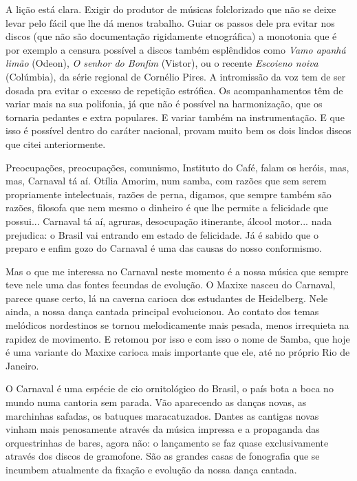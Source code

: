 A lição está clara. Exigir do produtor de músicas folclorizado que não
se deixe levar pelo fácil que lhe dá menos trabalho. Guiar os passos
dele pra evitar nos discos (que não são documentação rigidamente
etnográfica) a monotonia que é por exemplo a censura possível a discos
também esplêndidos como \emph{Vamo apanhá limão} (Odeon), \emph{O senhor
do Bonfim} (Vistor), ou o recente \emph{Escoieno noiva} (Colúmbia), da
série regional de Cornélio Pires. A intromissão da voz tem de ser dosada
pra evitar o excesso de repetição estrófica. Os acompanhamentos têm de
variar mais na sua polifonia, já que não é possível na harmonização, que
os tornaria pedantes e extra populares. E variar também na
instrumentação. E que isso é possível dentro do caráter nacional, provam
muito bem os dois lindos discos que citei anteriormente.




Preocupações, preocupações, comunismo, Instituto do Café, falam os
heróis, mas, mas, Carnaval tá aí. Otília Amorim, num samba, com razões
que sem serem propriamente intelectuais, razões de perna, digamos, que
sempre também são razões, filosofa que nem mesmo o dinheiro é que lhe
permite a felicidade que possui... Carnaval tá aí, agruras, desocupação
itinerante, álcool motor... nada prejudica: o Brasil vai entrando em
estado de felicidade. Já é sabido que o preparo e enfim gozo do Carnaval
é uma das causas do nosso conformismo.

Mas o que me interessa no Carnaval neste momento é a nossa música que
sempre teve nele uma das fontes fecundas de evolução. O Maxixe nasceu do
Carnaval, parece quase certo, lá na caverna carioca dos estudantes de
Heidelberg. Nele ainda, a nossa dança cantada principal evolucionou. Ao
contato dos temas melódicos nordestinos se tornou melodicamente mais
pesada, menos irrequieta na rapidez de movimento. E retomou por isso e
com isso o nome de Samba, que hoje é uma variante do Maxixe carioca mais
importante que ele, até no próprio Rio de Janeiro.

O Carnaval é uma espécie de cio ornitológico do Brasil, o país bota a
boca no mundo numa cantoria sem parada. Vão aparecendo as danças novas,
as marchinhas safadas, os batuques maracatuzados. Dantes as cantigas
novas vinham mais penosamente através da música impressa e a propaganda
das orquestrinhas de bares, agora não: o lançamento se faz quase
exclusivamente através dos discos de gramofone. São as grandes casas de
fonografia que se incumbem atualmente da fixação e evolução da nossa
dança cantada.

